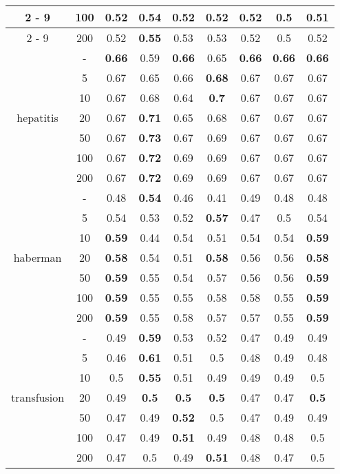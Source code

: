 \documentclass{article}%
\begin{document}
\begin{longtable}{c|c|ccccccc}
\cline{2%
-%
9}%
&100&0.52&\textbf{0.54}&0.52&0.52&0.52&0.5&0.51\\%
\cline{2%
-%
9}%
&200&0.52&\textbf{0.55}&0.53&0.53&0.52&0.5&0.52\\%
\hline%
\multirow{7}{*}{hepatitis}&{-}&\textbf{0.66}&0.59&\textbf{0.66}&0.65&\textbf{0.66}&\textbf{0.66}&\textbf{0.66}\\%
\cline{2%
-%
9}%
&5&0.67&0.65&0.66&\textbf{0.68}&0.67&0.67&0.67\\%
\cline{2%
-%
9}%
&10&0.67&0.68&0.64&\textbf{0.7}&0.67&0.67&0.67\\%
\cline{2%
-%
9}%
&20&0.67&\textbf{0.71}&0.65&0.68&0.67&0.67&0.67\\%
\cline{2%
-%
9}%
&50&0.67&\textbf{0.73}&0.67&0.69&0.67&0.67&0.67\\%
\cline{2%
-%
9}%
&100&0.67&\textbf{0.72}&0.69&0.69&0.67&0.67&0.67\\%
\cline{2%
-%
9}%
&200&0.67&\textbf{0.72}&0.69&0.69&0.67&0.67&0.67\\%
\hline%
\multirow{7}{*}{haberman}&{-}&0.48&\textbf{0.54}&0.46&0.41&0.49&0.48&0.48\\%
\cline{2%
-%
9}%
&5&0.54&0.53&0.52&\textbf{0.57}&0.47&0.5&0.54\\%
\cline{2%
-%
9}%
&10&\textbf{0.59}&0.44&0.54&0.51&0.54&0.54&\textbf{0.59}\\%
\cline{2%
-%
9}%
&20&\textbf{0.58}&0.54&0.51&\textbf{0.58}&0.56&0.56&\textbf{0.58}\\%
\cline{2%
-%
9}%
&50&\textbf{0.59}&0.55&0.54&0.57&0.56&0.56&\textbf{0.59}\\%
\cline{2%
-%
9}%
&100&\textbf{0.59}&0.55&0.55&0.58&0.58&0.55&\textbf{0.59}\\%
\cline{2%
-%
9}%
&200&\textbf{0.59}&0.55&0.58&0.57&0.57&0.55&\textbf{0.59}\\%
\hline%
\multirow{7}{*}{transfusion}&{-}&0.49&\textbf{0.59}&0.53&0.52&0.47&0.49&0.49\\%
\cline{2%
-%
9}%
&5&0.46&\textbf{0.61}&0.51&0.5&0.48&0.49&0.48\\%
\cline{2%
-%
9}%
&10&0.5&\textbf{0.55}&0.51&0.49&0.49&0.49&0.5\\%
\cline{2%
-%
9}%
&20&0.49&\textbf{0.5}&\textbf{0.5}&\textbf{0.5}&0.47&0.47&\textbf{0.5}\\%
\cline{2%
-%
9}%
&50&0.47&0.49&\textbf{0.52}&0.5&0.47&0.49&0.49\\%
\cline{2%
-%
9}%
&100&0.47&0.49&\textbf{0.51}&0.49&0.48&0.48&0.5\\%
\cline{2%
-%
9}%
&200&0.47&0.5&0.49&\textbf{0.51}&0.48&0.47&0.5\\%

\end{longtable}
\end{document}
